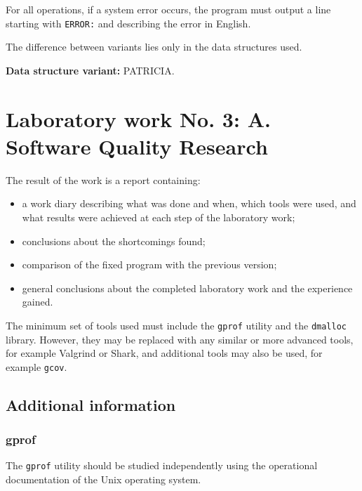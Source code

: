 For all operations, if a system error occurs, the program must output a line starting with
\texttt{ERROR:} and describing the error in English.

The difference between variants lies only in the data structures used.

{\bfseries Data structure variant:} PATRICIA.

\section*{Laboratory work No. 3: A. Software Quality Research}


The result of the work is a report containing:

\begin{itemize}
    \item a work diary describing what was done and when, which tools were used, and what results
    were achieved at each step of the laboratory work;
    \item conclusions about the shortcomings found;
    \item comparison of the fixed program with the previous version;
    \item general conclusions about the completed laboratory work and the experience gained.
\end{itemize}

The minimum set of tools used must include the \texttt{gprof} utility and the \texttt{dmalloc}
library. However, they may be replaced with any similar or more advanced tools, for example
Valgrind or Shark, and additional tools may also be used, for example \texttt{gcov}.

\subsection*{Additional information}

\subsubsection*{gprof}

The \texttt{gprof} utility should be studied independently using the operational documentation of
the Unix operating system.

